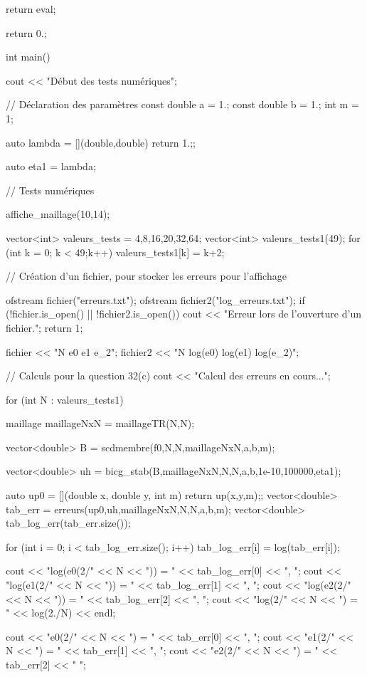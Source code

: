 \begin{codeblock}
{{{            return eval;
        }
    }

    return 0.;
}

int main(){
    cout << "Début des tests numériques\n";

    // Déclaration des paramètres
    const double a = 1.;
    const double b = 1.;
    int m = 1;

    auto lambda = [](double,double){ return 1.;};

    auto eta1 = lambda;

    // Tests numériques

    affiche_maillage(10,14);

    vector<int> valeurs_tests = {4,8,16,20,32,64};
    vector<int> valeurs_tests1(49);
    for (int k = 0; k < 49;k++) valeurs_tests1[k] = k+2;

    // Création d'un fichier, pour stocker les erreurs pour l'affichage

    ofstream fichier("erreurs.txt");
    ofstream fichier2("log_erreurs.txt");
    if (!fichier.is_open() || !fichier2.is_open()) {
        cout << "Erreur lors de l'ouverture d'un fichier.\n";
        return 1;
    }

    fichier << "N e0 e1 e_2\n";
    fichier2 << "N log(e0) log(e1) log(e_2)\n";

    // Calculs pour la question 32(c)
    cout << "Calcul des erreurs en cours...\n";

    for (int N : valeurs_tests1){
        maillage maillageNxN = maillageTR(N,N);

        vector<double> B = scdmembre(f0,N,N,maillageNxN,a,b,m);

        vector<double> uh = bicg_stab(B,maillageNxN,N,N,a,b,1e-10,100000,eta1);

        auto up0 = [](double x, double y, int m){ return up(x,y,m);};
        vector<double> tab_err = erreurs(up0,uh,maillageNxN,N,N,a,b,m);
        vector<double> tab_log_err(tab_err.size());

        for (int i = 0; i < tab_log_err.size(); i++){
            tab_log_err[i] = log(tab_err[i]);
        }

        cout << "log(e0(2/" << N << ")) = " << tab_log_err[0] << ", ";
        cout << "log(e1(2/" << N << ")) = " << tab_log_err[1] << ", ";
        cout << "log(e2(2/" << N << ")) = " << tab_log_err[2] << ", ";
        cout << "log(2/" << N << ") = " << log(2./N) << endl;

        cout << "e0(2/" << N << ") = " << tab_err[0] << ", ";
        cout << "e1(2/" << N << ") = " << tab_err[1] << ", ";
        cout << "e2(2/" << N << ") = " << tab_err[2] << " \n";

}}
\end{codeblock}
